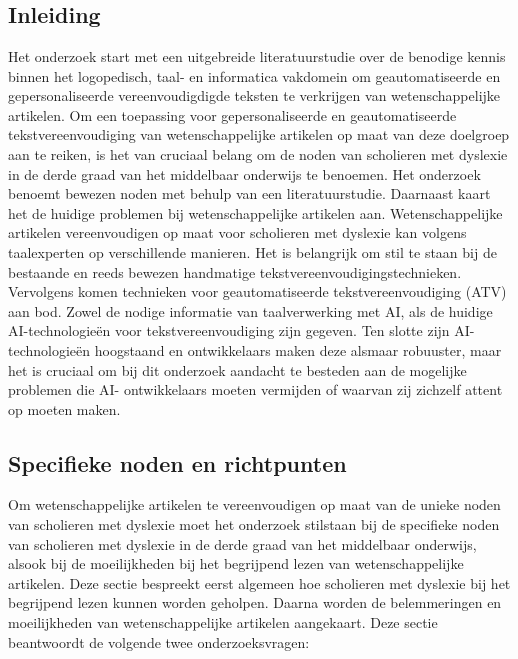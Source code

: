\chapter{}%
\label{ch:stand-van-zaken}

\section{Inleiding}

Het onderzoek start met een uitgebreide literatuurstudie over de benodige kennis binnen het logopedisch, taal- en informatica vakdomein om geautomatiseerde en gepersonaliseerde vereenvoudigdigde teksten te verkrijgen van wetenschappelijke artikelen. Om een toepassing voor gepersonaliseerde en geautomatiseerde tekstvereenvoudiging van wetenschappelijke artikelen  op maat van deze doelgroep aan te reiken, is het van cruciaal belang om de noden van scholieren met dyslexie in de derde graad van het middelbaar onderwijs te benoemen. Het onderzoek benoemt bewezen noden met behulp van een literatuurstudie. Daarnaast kaart het de huidige problemen bij wetenschappelijke artikelen aan. Wetenschappelijke artikelen vereenvoudigen op maat voor scholieren met dyslexie kan volgens taalexperten op verschillende manieren. Het is belangrijk om stil te staan bij de bestaande en reeds bewezen handmatige tekstvereenvoudigingstechnieken. Vervolgens komen technieken voor geautomatiseerde tekstvereenvoudiging (ATV) aan bod. Zowel de nodige informatie van taalverwerking met AI, als de huidige AI-technologieën voor tekstvereenvoudiging zijn gegeven. Ten slotte zijn AI- technologieën hoogstaand en ontwikkelaars maken deze alsmaar robuuster, maar het is cruciaal om bij dit onderzoek aandacht te besteden aan de mogelijke problemen die AI- ontwikkelaars moeten vermijden of waarvan zij zichzelf attent op moeten maken. 

\section{Specifieke noden en richtpunten}

Om wetenschappelijke artikelen te vereenvoudigen op maat van de unieke noden van scholieren met dyslexie moet het onderzoek stilstaan bij de specifieke noden van scholieren met dyslexie in de derde graad van het middelbaar onderwijs, alsook bij de moeilijkheden bij het begrijpend lezen van wetenschappelijke artikelen. Deze sectie bespreekt eerst algemeen hoe scholieren met dyslexie bij het begrijpend lezen kunnen worden geholpen. Daarna worden de belemmeringen en moeilijkheden van wetenschappelijke artikelen aangekaart. Deze sectie beantwoordt de volgende twee onderzoeksvragen: 

